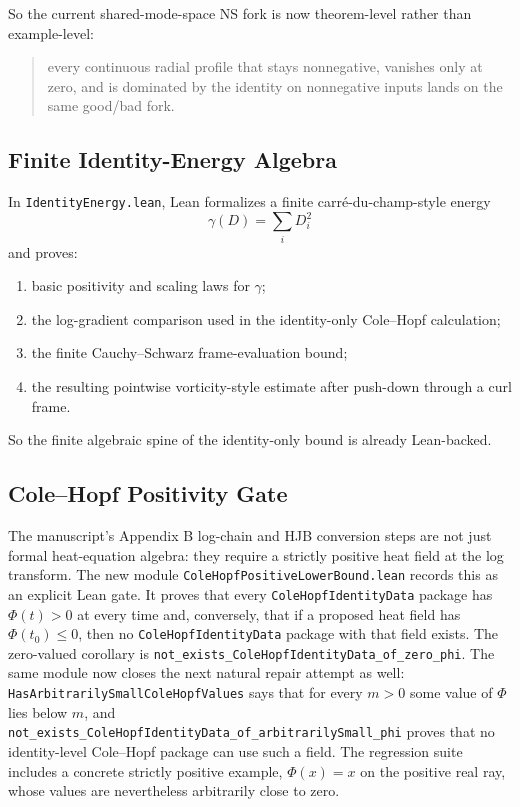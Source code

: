\documentclass[11pt]{article}
\begin{document}
So the current shared-mode-space NS fork is now theorem-level rather than
example-level:
\begin{quote}
every continuous radial profile that stays nonnegative, vanishes only at zero,
and is dominated by the identity on nonnegative inputs lands on the same
good/bad fork.
\end{quote}

\subsection{Finite Identity-Energy Algebra}

In \texttt{IdentityEnergy.lean}, Lean formalizes a finite
carr\'e-du-champ-style energy
\[
\gamma(D) = \sum_i D_i^2
\]
and proves:
\begin{enumerate}[leftmargin=1.5em]
  \item basic positivity and scaling laws for \(\gamma\);
  \item the log-gradient comparison used in the identity-only
  Cole--Hopf calculation;
  \item the finite Cauchy--Schwarz frame-evaluation bound;
  \item the resulting pointwise vorticity-style estimate after push-down
  through a curl frame.
\end{enumerate}

So the finite algebraic spine of the identity-only bound is already Lean-backed.

\subsection{Cole--Hopf Positivity Gate}

The manuscript's Appendix B log-chain and HJB conversion steps are not just
formal heat-equation algebra: they require a strictly positive heat field at
the log transform.  The new module
\texttt{ColeHopfPositiveLowerBound.lean} records this as an explicit Lean gate.
It proves that every \texttt{ColeHopfIdentityData} package has
\(\Phi(t)>0\) at every time and, conversely, that if a proposed heat field has
\(\Phi(t_0)\le 0\), then no \texttt{ColeHopfIdentityData} package with that
field exists.  The zero-valued corollary is
\texttt{not\_exists\_ColeHopfIdentityData\_of\_zero\_phi}.
The same module now closes the next natural repair attempt as well:
\texttt{HasArbitrarilySmallColeHopfValues} says that for every \(m>0\) some
value of \(\Phi\) lies below \(m\), and
\texttt{not\_exists\_ColeHopfIdentityData\_of\_arbitrarilySmall\_phi} proves
that no identity-level Cole--Hopf package can use such a field.  The regression
suite includes a concrete strictly positive example, \(\Phi(x)=x\) on the
positive real ray, whose values are nevertheless arbitrarily close to zero.
\end{document}

